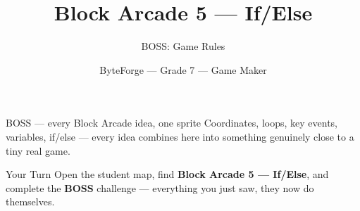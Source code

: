 \documentclass[aspectratio=169]{beamer}
\title{Block Arcade 5 — If/Else}
\subtitle{BOSS: Game Rules}
\author{ByteForge --- Grade 7 --- Game Maker}
\date{}
\begin{document}
\begin{frame}
    \titlepage
\end{frame}

\begin{frame}{BOSS — every Block Arcade idea, one sprite}
    \Large
    Coordinates, loops, key events, variables, if/else — every idea combines here into something genuinely close to a tiny real game.
\end{frame}

\begin{frame}{Your Turn}
    \Large
    Open the student map, find \textbf{Block Arcade 5 — If/Else}, and complete
    the \textbf{BOSS} challenge --- everything you just saw, they now do themselves.
\end{frame}
\end{document}
